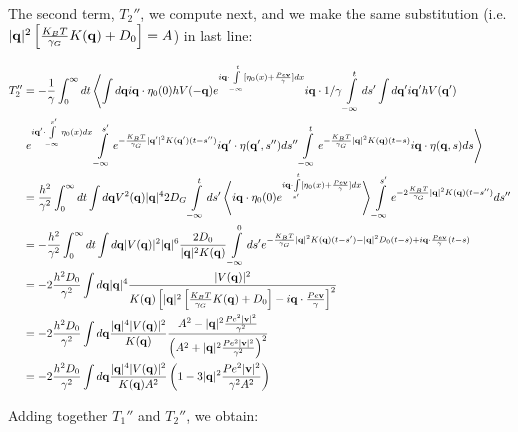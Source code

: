 \documentclass[amsmath,preprintnumbers,10pt,article,notitlepage]{revtex4-1}
\begin{document}
The second term, $T_2''$, we compute next, and we make the same substitution (i.e. $|{\bf q}|^2 \left[ \frac{K_BT}{\gamma_G} K({\bf q}) + D_0 \right] = A$) in last line:

\begin{align}
T_2'' & =  - \dfrac{1}{\gamma}  \int_0^{\infty} dt \left \langle \int d{\bf q}  i{\bf q} \cdot \eta_0(0)   h V(-{\bf q}) e^{i{\bf q} \cdot \int\limits_{-\infty}^{t}  [ \eta_0(x) + \frac{Pe{\bf v}}{\gamma}] dx}  i{\bf q}  \cdot  1/\gamma \int\limits_{-\infty}^{t} ds' \int d{\bf q}' i{\bf q'}  h V({ \bf q}') \right. \\
& \left. e^{i{\bf q}' \cdot \int\limits_{-\infty}^{s'} \eta_0(x)dx} \int\limits_{-\infty}^{s'} e^{-\frac{K_BT}{\gamma_G} |{\bf q}'|^2 K({\bf q'})(t-s'')} i{\bf q}' \cdot \eta({\bf q'}, s'') ds''  \int\limits_{-\infty}^{t} e^{-\frac{K_BT}{\gamma_G}|{\bf q}|^2 K({\bf q})(t-s)} i{\bf q} \cdot \eta({\bf q}, s) ds\right \rangle \\
& = \frac{h^2}{\gamma^2}  \int_0^{\infty} dt  \int d{\bf q}   V^2({\bf q})  |{\bf q}|^4 2D_G \int\limits_{-\infty}^{t} ds'  \left \langle  i{\bf q} \cdot \eta_0(0) e^{i{\bf q} \cdot \int\limits_{s'}^{t}  [ \eta_0(x) + \frac{Pe{\bf v}}{\gamma}] dx} \right \rangle \int\limits_{-\infty}^{s'} e^{-2\frac{K_BT}{\gamma_G} |{\bf q}|^2 K({\bf q})(t-s'')} ds'' \\
& = -\frac{h^2}{\gamma^2}  \int_0^{\infty} dt  \int d{\bf q}  |V({\bf q})|^2 |{\bf q}|^6 \dfrac{2D_0}{|{\bf q}|^2 K({\bf q})}  \int\limits_{-\infty}^{0} ds' e^{-\frac{K_BT}{\gamma_G} |{\bf q}|^2 K({\bf q})(t-s') - |{\bf q}|^2 D_0(t-s) + i{\bf q} \cdot \frac{Pe{\bf v}}{\gamma}(t-s)} \\
& = -2 \dfrac{h^2 D_0}{\gamma^2} \int d{\bf q} |{\bf q}|^4  \dfrac{|V({\bf q})|^2}{K({\bf q})\left[ |{\bf q}|^2 \left[ \frac{K_BT}{\gamma_G} K({\bf q}) + D_0\right] - i {\bf q} \cdot \frac{Pe{\bf v} }{\gamma} \right]^2 } \\
& = -2 \frac{h^2 D_0}{\gamma^2} \int d{\bf q}  \dfrac{|{\bf q}|^4 |V({\bf q})|^2}{K({\bf q})} \dfrac{A^2 - |{\bf q}|^2 \frac{Pe^2 |{\bf v}|^2}{\gamma^2}}{\left( A^2 + |{\bf q}|^2 \frac{Pe^2 |{\bf v}|^2}{\gamma^2} \right)^2} \\
& = -2 \frac{h^2 D_0}{\gamma^2} \int d{\bf q}  \dfrac{ |{\bf q}|^4 |V({\bf q})|^2}{K({\bf q}) A^2} \left( 1 - 3 |{\bf q}|^2 \frac{Pe^2 |{\bf v}|^2}{\gamma^2 A^2}  \right) \\
\label{eq:NoiseForceDiffusion2}
\end{align}

Adding together $T_1''$ and $T_2''$, we obtain:
\end{document}
